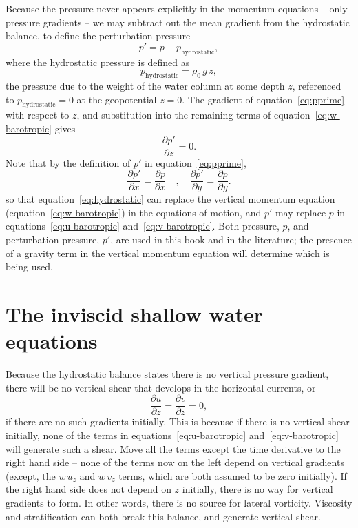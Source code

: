 \documentclass[11pt]{report}
\numberwithin{equation}{section}
\begin{document}
Because the pressure never appears explicitly in the momentum equations -- only pressure gradients -- we may subtract out the mean gradient from the hydrostatic balance, to define the perturbation pressure
\begin{equation}
    \label{eq:pprime}
    p' = p - p_{\mathrm{hydrostatic}},
\end{equation}
where the hydrostatic pressure is defined as
\begin{equation}
    p_{\mathrm{hydrostatic}} = \rho_0\,g\,z,
\end{equation}
the pressure due to the weight of the water column at some depth $z$, referenced to $p_{\mathrm{hydrostatic}}=0$ at the geopotential $z=0$.  The gradient of equation~\ref{eq:pprime} with respect to $z$, and substitution into the remaining terms of equation~\ref{eq:w-barotropic} gives
\begin{equation}
    \label{eq:hydrostatic}
    \frac{\partial p'}{\partial z} = 0.
\end{equation}
Note that by the definition of $p'$ in equation~\ref{eq:pprime},
\begin{equation}
    \frac{\partial p'}{\partial x} = \frac{\partial p}{\partial x} \quad , \quad
    \frac{\partial p'}{\partial y} = \frac{\partial p}{\partial y}.
\end{equation}
so that equation~\ref{eq:hydrostatic} can replace the vertical momentum equation (equation~\ref{eq:w-barotropic}) in the equations of motion, and $p'$ may replace $p$ in equations~\ref{eq:u-barotropic} and~\ref{eq:v-barotropic}.  Both pressure, $p$, and perturbation pressure, $p'$, are used in this book and in the literature; the presence of a gravity term in the vertical momentum equation will determine which is being used.

\section{The inviscid shallow water equations}

Because the hydrostatic balance states there is no vertical pressure gradient, there will be no vertical shear that develops in the horizontal currents, or
\begin{equation}
    \frac{\partial u}{\partial z} = \frac{\partial v}{\partial z} = 0,
\end{equation}
if there are no such gradients initially.  This is because if there is no vertical shear initially, none of the terms in equations~\ref{eq:u-barotropic} and~\ref{eq:v-barotropic} will generate such a shear.  Move all the terms except the time derivative to the right hand side -- none of the terms now on the left depend on vertical gradients (except, the $w\,u_z$ and $w\,v_z$ terms, which are both assumed to be zero initially).   If the right hand side does not depend on $z$ initially, there is no way for vertical gradients to form.  In other words, there is no source for lateral vorticity.  Viscosity and stratification can both break this balance, and generate vertical shear.
\end{document}
